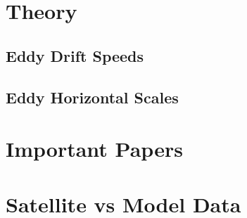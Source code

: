\label{chap:intro}

\section{Theory}

\subsection{Eddy Drift Speeds}\label{subsec:speeds}

\subsection{Eddy Horizontal Scales}

\section[History]{Important Papers}

\section{Satellite vs Model Data} \label{sec:satvsmod}

